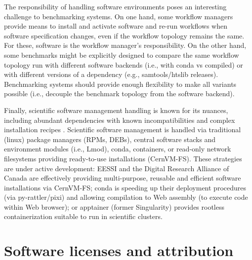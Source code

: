 \documentclass[11pt]{article}
\begin{document}
{\color{red} 
The responsibility of handling software environments poses an interesting challenge to benchmarking systems. On one hand, some workflow managers provide means to install and activate software and re-run workflows when software specification changes, even if the workflow topology remains the same. For these, software is the workflow manager's responsibility. On the other hand, some benchmarks might be explicitly designed to compare the same workflow topology run with different software backends (i.e., with conda vs compiled) or with different versions of a dependency (e.g., samtools/htslib releases). Benchmarking systems should provide enough flexibility to make all variants possible (i.e., decouple the benchmark topology from the software backend).

Finally, scientific software management handling is known for its nuances, including abundant dependencies with known incompatibilities and complex installation recipes \cite{droge2023-ax}. Scientific software management is handled via traditional (linux) package managers (RPMs, DEBs), central software stacks and environment modules (i.e., Lmod), conda, containers, or read-only network filesystems providing ready-to-use installations (CernVM-FS). These strategies are under active development: EESSI \cite{droge2023-ax} and the Digital Research Alliance of Canada \cite{Boissonneault2019-wm} are effectively providing multi-purpose, reusable and efficient software installations via CernVM-FS; conda is speeding up their deployment procedures (via py-rattler/pixi) and allowing compilation to Web assembly (to execute code within Web browser); or apptainer (former Singularity) provides rootless containerization suitable to run in scientific clusters. 
}


\section*{Software licenses and attribution}
\end{document}
